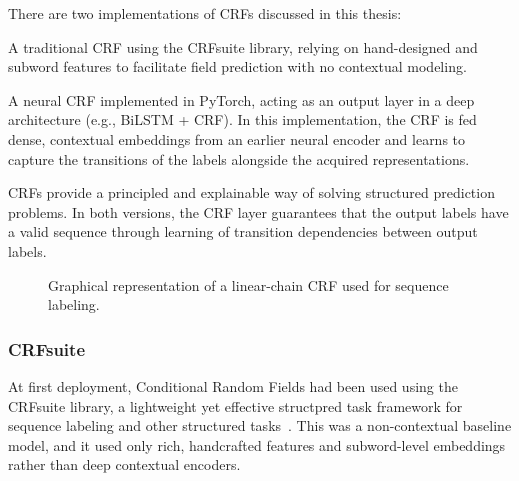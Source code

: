 There are two implementations of CRFs discussed in this thesis:
\begin{compactitem}
\item A traditional CRF using the CRFsuite library, relying on hand-designed and subword features to facilitate field prediction with no contextual modeling.
\item A neural CRF implemented in PyTorch, acting as an output layer in a deep architecture (e.g., BiLSTM + CRF). In this implementation, the CRF is fed dense, contextual embeddings from an earlier neural encoder and learns to capture the transitions of the labels alongside the acquired representations.
\end{compactitem}
CRFs provide a principled and explainable way of solving structured prediction problems. In both versions, the CRF layer guarantees that the output labels have a valid sequence through learning of transition dependencies between output labels.
\begin{figure}[ht]
    \centering
    
    \caption[Linear-Chain CRF for Sequence Labeling]{Graphical representation of a linear-chain CRF used for sequence labeling.}
    \label{fig:crf-chain}
\end{figure}

\subsubsection{CRFsuite}
At first deployment, Conditional Random Fields had been used using the CRFsuite library, a lightweight yet effective structpred task framework for sequence labeling and other structured tasks~\cite{pythoncrfsuite}. This was a non-contextual baseline model, and it used only rich, handcrafted features and subword-level embeddings rather than deep contextual encoders.

